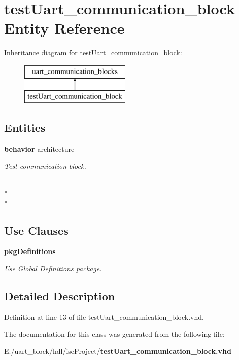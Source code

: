 \section{test\-Uart\-\_\-communication\-\_\-block Entity Reference}
\label{classtest_uart__communication__block}
Inheritance diagram for test\-Uart\-\_\-communication\-\_\-block\-:\begin{figure}[H]
\begin{center}
\leavevmode
\includegraphics[height=2.000000cm]{classtest_uart__communication__block}
\end{center}
\end{figure}
\subsection*{Entities}
\begin{DoxyCompactItemize}
\item 
{\bf behavior} architecture
\begin{DoxyCompactList}\small\item\em Test communication block. \end{DoxyCompactList}\end{DoxyCompactItemize}
\\*
\\*
\subsection*{Use Clauses}
 \begin{DoxyCompactItemize}
\item 
{\bf pkg\-Definitions}   \label{classtest_uart__communication__block_ac442dca664056131bdaf5c92e4351e01}

\begin{DoxyCompactList}\small\item\em Use Global Definitions package. \end{DoxyCompactList}\end{DoxyCompactItemize}


\subsection{Detailed Description}


Definition at line 13 of file test\-Uart\-\_\-communication\-\_\-block.\-vhd.



The documentation for this class was generated from the following file\-:\begin{DoxyCompactItemize}
\item 
E\-:/uart\-\_\-block/hdl/ise\-Project/{\bf test\-Uart\-\_\-communication\-\_\-block.\-vhd}\end{DoxyCompactItemize}
